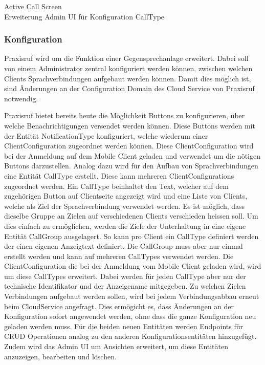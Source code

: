 Active Call Screen \\
Erweiterung Admin UI für Konfiguration CallType \\

\clearpage
\subsubsection*{Konfiguration}

Praxisruf wird um die Funktion einer Gegensprechanlage erweitert.
Dabei soll von einem Administrator zentral konfiguriert werden können, zwischen welchen Clients Sprachverbindungen
aufgebaut werden können.
Damit dies möglich ist, sind Änderungen an der Configuration Domain des Cloud Service von Praxisruf notwendig.

Praxisruf bietet bereits heute die Möglichkeit Buttons zu konfigurieren, über welche Benachrichtigungen versendet werden können.
Diese Buttons werden mit der Entität NotificationType konfiguriert, welche wiederum einer ClientConfiguration zugeordnet werden können.
Diese ClientConfiguration wird bei der Anmeldung auf dem Mobile Client geladen und verwendet um die nötigen Buttons darzustellen.
Analog dazu wird für den Aufbau von Sprachverbindungen eine Entität CallType erstellt.
Diese kann mehreren ClientConfigurations zugeordnet werden.
Ein CallType beinhaltet den Text, welcher auf dem zugehörigen Button auf Clientseite angezeigt wird und eine Liste von
Clients, welche als Ziel der Sprachverbindung verwendet werden.
Es ist möglich, dass dieselbe Gruppe an Zielen auf verschiedenen Clients verschieden heissen soll.
Um dies einfach zu ermöglichen, werden die Ziele der Unterhaltung in eine eigene Entität CallGroup ausgelagert.
So kann pro Client ein CallType definiert werden der einen eigenen Anzeigtext definiert.
Die CallGroup muss aber nur einmal erstellt werden und kann auf mehreren CallTypes verwendet werden.
Die ClientConfiguration die bei der Anmeldung vom Mobile Client geladen wird, wird um diese CallTypes erweitert.
Dabei werden für jeden CallType aber nur der technische Identifikator und der Anzeigename mitgegeben.
Zu welchen Zielen Verbindungen aufgebaut werden sollen, wird bei jedem Verbindungsabbau erneut beim CloudService angefragt.
Dies ermögicht es, dass Änderungen an der Konfiguration sofort angewendet werden, ohne dass die ganze Konfiguration neu geladen werden muss.
Für die beiden neuen Entitäten werden Endpoints für CRUD Operationen analog zu den anderen Konfigurationsentitäten hinzugefügt.
Zudem wird das Admin UI um Ansichten erweitert, um diese Entitäten anzuzeigen, bearbeiten und löschen.

